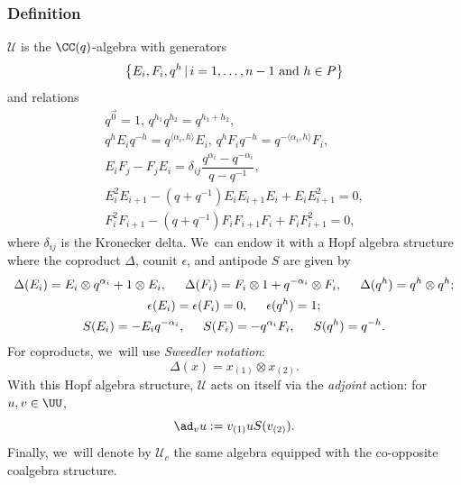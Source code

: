 \subsubsection{Definition}
$\mathcal{U}$ is the $\CC(q)$-algebra with generators
\[
\left\{ E_i, F_i, q^h\, |\, i=1,\ldots, n-1\hbox{ and }h\in P \right\}
\]
and relations
\begin{gather*}
q^{\vec{0}}=1,\,q^{h_1}q^{h_2}=q^{h_1+h_2},\\
q^hE_iq^{-h}=q^{\langle\alpha_i,h\rangle}E_i,\,q^hF_iq^{-h}=q^{-\langle\alpha_i,h\rangle}F_i,\\
E_iF_j-F_jE_i=\delta_{ij}\dfrac{q^{\alpha_i}-q^{-\alpha_i}}{q-q^{-1}},\\
E_i^2E_{i+1}-(q+q^{-1})E_iE_{i+1}E_i+E_iE_{i+1}^2=0,\\
F_i^2F_{i+1}-(q+q^{-1})F_iF_{i+1}F_i+F_iF_{i+1}^2=0,
\end{gather*}
where $\delta_{ij}$ is the Kronecker delta. We~can endow it with a Hopf algebra structure where the coproduct $\Delta$, counit $\epsilon$, and antipode $S$ are given by
\begin{gather*}
\Delta(E_i)=E_i\otimes q^{\alpha_i}+1\otimes E_i,\hspace{.5cm}\Delta(F_i)=F_i\otimes 1+q^{-\alpha_i}\otimes F_i,\hspace{.5cm}\Delta(q^h)=q^h\otimes q^h;\\
\epsilon(E_i)=\epsilon(F_i)=0,\hspace{.5cm}\epsilon(q^h)=1;\\
S(E_i)=-E_iq^{-\alpha_i},\hspace{.5cm}S(F_i)=-q^{\alpha_i}F_i,\hspace{.5cm}S(q^h)=q^{-h}.
\end{gather*}
For coproducts, we~will use \textit{Sweedler notation}:
\[
\Delta(x)=x_{(1)}\otimes x_{(2)}.
\]
With this Hopf algebra structure, $\mathcal{U}$ acts on itself via the \textit{adjoint} action: for $u,v\in\UU$,
\[
\ad_v u:=v_{(1)}uS (v_{(2)}).
\]
Finally, we~will denote by $\mathcal{U}_c$ the same algebra equipped with the co-opposite coalgebra structure.

